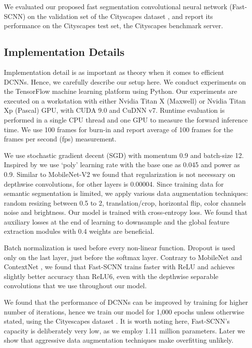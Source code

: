 \documentclass[10pt,twocolumn,letterpaper]{article}
\begin{document}
We evaluated our proposed fast segmentation convolutional neural network (Fast-SCNN) on the validation set of the Cityscapes dataset \cite{cityscaples2016}, and report its performance on the Cityscapes test set, \ie the Cityscapes benchmark server.

\subsection{Implementation Details}
Implementation detail is as important as theory when it comes to efficient DCNNs. Hence, we carefully describe our setup here. We conduct experiments on the TensorFlow machine learning platform using Python. Our experiments are executed on a workstation with either Nvidia Titan X (Maxwell) or Nvidia Titan Xp (Pascal) GPU, with CUDA 9.0 and CuDNN v7. Runtime evaluation is performed in a single CPU thread and one GPU to measure the forward inference time. We use 100 frames for burn-in and report average of 100 frames for the frames per second (fps) measurement.

We use stochastic gradient decent (SGD) with momentum 0.9 and batch-size 12. Inspired by \cite{deeplab-v2-chen2016,pspnet-zhao2017a,mobilenet-howard2017} we use `poly' learning rate with the base one as 0.045 and power as 0.9. Similar to MobileNet-V2 we found that  regularization is not necessary on depthwise convolutions, for other layers  is 0.00004. Since training data for semantic segmentation is limited, we apply various data augmentation techniques: random resizing between 0.5 to 2, translation/crop, horizontal flip, color channels noise and brightness. Our model is trained with cross-entropy loss. We found that auxiliary losses at the end of learning to downsample and the global feature extraction modules with 0.4 weights are beneficial.

Batch normalization \cite{batch-norm-ioffe2015} is used before every non-linear function. Dropout is used only on the last layer, just before the softmax layer. Contrary to MobileNet \cite{mobilenet-howard2017} and ContextNet \cite{contextnet-poudel2018}, we found that Fast-SCNN trains faster with ReLU and achieves slightly better accuracy than ReLU6, even with the depthwise separable convolutions that we use throughout our model.

We found that the performance of DCNNs can be improved by training for higher number of iterations, hence we train our model for 1,000 epochs unless otherwise stated, using the Cityescapes dataset \cite{cityscaples2016}. It is worth noting here, Fast-SCNN's capacity is deliberately very low, as we employ 1.11 million parameters. Later we show that aggressive data augmentation techniques make overfitting unlikely.
\end{document}

